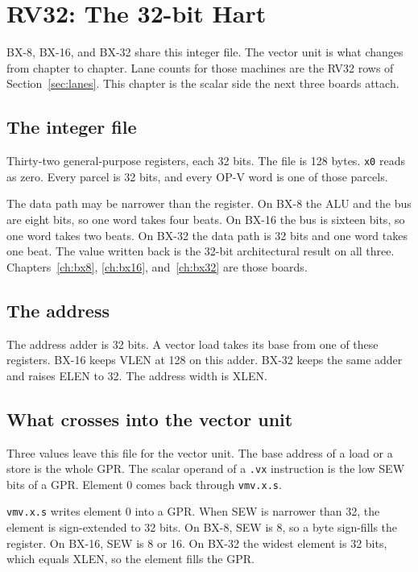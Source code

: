 \chapter{RV32: The 32-bit Hart}
\label{ch:rv32}

BX-8, BX-16, and BX-32 share this integer file. The vector unit is what changes from chapter to chapter. Lane counts for those machines are the RV32 rows of Section~\ref{sec:lanes}. This chapter is the scalar side the next three boards attach.

\section{The integer file}

Thirty-two general-purpose registers, each 32 bits. The file is 128 bytes. \texttt{x0} reads as zero. Every parcel is 32 bits, and every OP-V word is one of those parcels.

The data path may be narrower than the register. On BX-8 the ALU and the bus are eight bits, so one word takes four beats. On BX-16 the bus is sixteen bits, so one word takes two beats. On BX-32 the data path is 32 bits and one word takes one beat. The value written back is the 32-bit architectural result on all three. Chapters~\ref{ch:bx8}, \ref{ch:bx16}, and~\ref{ch:bx32} are those boards.

\section{The address}

The address adder is 32 bits. A vector load takes its base from one of these registers. BX-16 keeps VLEN at 128 on this adder. BX-32 keeps the same adder and raises ELEN to 32. The address width is XLEN.

\section{What crosses into the vector unit}

Three values leave this file for the vector unit. The base address of a load or a store is the whole GPR. The scalar operand of a \texttt{.vx} instruction is the low SEW bits of a GPR. Element 0 comes back through \texttt{vmv.x.s}.

\texttt{vmv.x.s} writes element 0 into a GPR. When SEW is narrower than 32, the element is sign-extended to 32 bits. On BX-8, SEW is 8, so a byte sign-fills the register. On BX-16, SEW is 8 or 16. On BX-32 the widest element is 32 bits, which equals XLEN, so the element fills the GPR.

